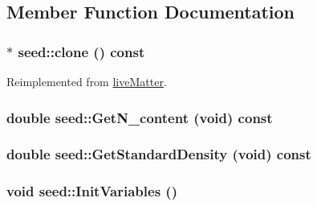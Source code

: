 \subsection{Member Function Documentation}
\hypertarget{classseed_a0e2e68f7724e0551b885433a1e935ebf}{
\subsubsection[{clone}]{ $\ast$ seed::clone () const}}
\label{classseed_a0e2e68f7724e0551b885433a1e935ebf}


Reimplemented from \hyperlink{classlive_matter_a08101ef64ee3eeec55d222bb75975370}{liveMatter}.\hypertarget{classseed_a677b6a35306d0e55fb71b78182cbfb15}{
\subsubsection[{GetN\_\-content}]{\setlength{\rightskip}{0pt plus 5cm}double seed::GetN\_\-content (void) const}}
\label{classseed_a677b6a35306d0e55fb71b78182cbfb15}
\hypertarget{classseed_a716b7477525fd7eb4cb4c7144bbb1d8c}{
\subsubsection[{GetStandardDensity}]{\setlength{\rightskip}{0pt plus 5cm}double seed::GetStandardDensity (void) const}}
\label{classseed_a716b7477525fd7eb4cb4c7144bbb1d8c}
\hypertarget{classseed_aabcb716243f0c8e8c57f05cf0f140a17}{
\subsubsection[{InitVariables}]{\setlength{\rightskip}{0pt plus 5cm}void seed::InitVariables ()}}
\label{classseed_aabcb716243f0c8e8c57f05cf0f140a17}



